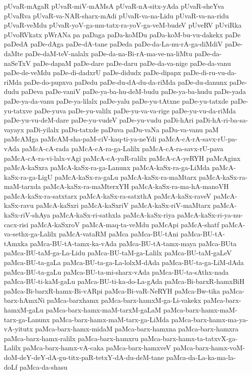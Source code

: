 {pUvaR-mAgaR
pUvaR-miV-mAMsA
pUvaR-nA-sitx-yAda
pUvaR-sheYva
pUvaRva
pUvaR-va-NAR-sharx-mAdi
pUvaR-va-na-Lidu
pUvaR-va-na-ridu
pUvaR-veMdu
pUvaR-yoV-ga-mu-tatx-ra-yoV-ga-veM-budeV
pUveRV
pUviRka
pUvoRVkatx
pWrANa
pa
paDaga
paDa-koMDu
paDa-koM-bu-vu-dakekx
paDe
paDedA
paDe-dAga
paDe-dA-tane
paDeda
paDe-da-La-nu-rA-ga-diMdiV
paDe-daMte
paDe-daM-teV-nalalx
paDe-da-na-Bi-rA-ma-ve-na-liMtu
paDe-da-naSeTxV
paDe-dapaM
paDe-dare
paDe-daru
paDe-da-va-nige
paDe-da-vanu
paDe-de-veMdu
paDe-di-dadxrU
paDe-didudx
paDe-dipapx
paDe-di-ru-vu-da-riMda
paDe-do-pupxva
paDedu
paDe-du-dA-du-da-riMda
paDe-du-danunx
paDe-dudu
paDeva
paDe-vaniV
paDe-ya-ba-hu-deM-budu
paDe-ya-ba-hudu
paDe-yada
paDe-ya-da-vanu
paDe-ya-lilalx
paDe-yalu
paDe-yu-tAtxne
paDe-yu-tatxde
paDe-yu-tatxve
paDe-yuva
paDe-yu-valilx
paDe-yu-va-va-rige
paDe-yu-vu-da-riMda
paDe-yu-vu-deM-dare
paDe-yu-vudeV
paDe-yu-vudu
paDi-hAri
paDi-hA-ri-ba-sa-vayayx
paDi-yilalx
paDu-tatxde
paDuva
paDu-vaNa
paDu-va-vanu
paM
paMcAMga
paMcAM-sha-paM-ciV-kaq-ti-ya-neYdi
paMcA-cA-rA-savx-rU-pa-vAda
paMcA-cA-rada
paMcA-cA-ra-ga-Lalilx
paMcA-cA-ra-savx-rU-pava
paMcA-cA-ra-vi-lalx-vAgi
paMcA-cA-yaR-ralilx
paMcA-cA-yeRYH
paMcAginx
paMcA-kaSxra
paMcA-kaSx-ra-ga-Lanunx
paMcA-kaSx-ra-ga-LiMda
paMcA-kaSx-ra-ga-LigU
paMcA-kaSx-ra-gaLu
paMcA-kaSx-ra-maMtarx
paMcA-kaSx-ra-maM-tarxda
paMcA-kaSx-ra-maMterxYH
paMcA-kaSx-ra-ma-hA-manoVH
paMcA-kaSx-ra-satxtarx
paMcA-kaSx-ra-satxthA
paMcA-kaSx-raveV
paMcA-kaSx-ravu
paMcA-kaSxri
paMcA-kaSxriV
paMcA-kaSx-riV-maMtarx
paMcA-kaSx-riV-shAya
paMcA-kaSx-ri-sathxla
paMcA-kaSx-riya
paMcA-kaSx-ri-ya-nu-cacx-risi
paMcA-kaSxroV
paMcA-maq-ta-veMdu
paMcApi
paMcA-shatf
paMcA-va-sethx-ga-Lalilx
paMcA-vataRM
paMca
paMca-BU-tAni
paMca-BU-tA-tAmxka
paMca-BU-tA-tamx-ka-vAda
paMca-BU-tA-tamx-maya
paMca-BUta
paMca-BU-taM-ga-La-Lidu
paMca-BU-taM-ga-Lalilx
paMca-BU-taM-gaLeV
paMca-BU-ta-gaLa
paMca-BU-ta-ga-La-lolxM-dAda
paMca-BU-ta-ga-LiM-dAda
paMca-BU-ta-gaLu
paMca-BU-ta-mi-sharx-vAda
paMca-BU-ta-sAthx-nada
paMca-BU-ti-kaM-gaLu
paMca-BU-ti-ka-do-La-gAda
paMca-Bi-barxR-hamxBiH
paMca-Bi-barxR-hamx-Bi-vARpi
paMca-Bi-vaR-NeRYH
paMca-Bw-tika
paMca-barx-hAmxNi
paMca-barxhamx
paMca-barx-hamxM-ga-Li-vakekx
paMca-barx-hamxM-gaLu
paMca-barx-hamx-maM-tarxM-gaLaM
paMca-barx-hamx-maM-tarx-ga-Lanunx
paMca-barx-hamx-maM-tarx-ga-LiMda
paMca-barx-hamx-ma-ya-vA-yitutx
paMca-barx-hamx-midaM
paMca-barx-hamxna
paMca-barx-hamxra
paMca-barx-hamx-ralilx
paMca-barx-hamxru
paMca-barx-hamx-ta-tatxvX-ga-Lalilx
paMca-barx-hamx-vA-caka
paMca-barx-hamxveV
paMca-barx-hamx-voM-doM-deY-deY-dA-gu-titx-paR-tetxY-dA-du-deM-tane
paMca-da-La-ka-ma-la-doLf
paMca-da-shasu
}
